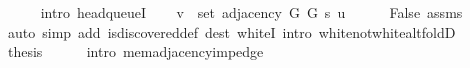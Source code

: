 \begin{isabellebody}
\ \ \ \ \isamarkupfalse%
\ {\isacharparenleft}{\kern0pt}intro\ head{\isacharunderscore}{\kern0pt}queueI{\isacharunderscore}{\kern0pt}{}{\isacharparenright}{\kern0pt}\isanewline
\ \ \isamarkupfalse%
\ {\isachardoublequoteopen}v\ {\isasymin}\ set\ {\isacharparenleft}{\kern0pt}adjacency\ G{}\ G{}\ s\ u{\isacharparenright}{\kern0pt}{\isachardoublequoteclose}\isanewline
\ \ \ \ \isamarkupfalse%
\ False\ assms\isanewline
\ \ \ \ \isamarkupfalse%
\ {\isacharparenleft}{\kern0pt}auto\ simp\ add{\isacharcolon}{\kern0pt}\ is{\isacharunderscore}{\kern0pt}discovered{\isacharunderscore}{\kern0pt}def\ dest{\isacharcolon}{\kern0pt}\ whiteI\ intro{\isacharcolon}{\kern0pt}\ white{\isacharunderscore}{\kern0pt}not{\isacharunderscore}{\kern0pt}white{\isacharunderscore}{\kern0pt}alt{\isacharunderscore}{\kern0pt}foldD{\isacharparenleft}{\kern0pt}{}{\isacharparenright}{\kern0pt}{\isacharparenright}{\kern0pt}\isanewline
\ \ \isamarkupfalse%
\ {\isacharquery}{\kern0pt}thesis\isanewline
\ \ \ \ \isamarkupfalse%
\ {\isacharparenleft}{\kern0pt}intro\ mem{\isacharunderscore}{\kern0pt}adjacency{\isacharunderscore}{\kern0pt}imp{\isacharunderscore}{\kern0pt}edge{\isacharparenright}{\kern0pt}\isanewline
{}\isamarkupfalse%
%
\endisatagproof
{\isafoldproof}%
%
\isadelimproof
%
\endisadelimproof
%
\isadelimdocument
%
\endisadelimdocument
%
\isatagdocument
%

\end{isabellebody}
